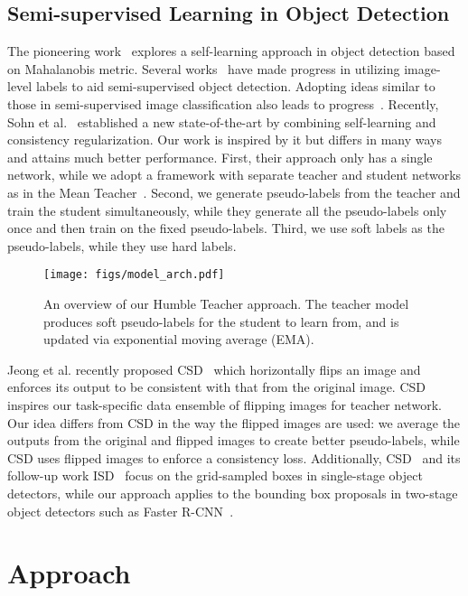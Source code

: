 \documentclass[final]{cvpr}
\begin{document}
\subsection{Semi-supervised Learning in Object Detection}
The pioneering work~\cite{rosenberg2005semi} explores a self-learning approach in object detection based on Mahalanobis metric.
Several works~\cite{gao2019note,hoffman2014lsda,tang2016large} have made progress in utilizing image-level labels to aid semi-supervised object detection.
Adopting ideas similar to those in semi-supervised image classification also leads to progress~\cite{zoph2020rethinking}.
Recently, Sohn et al.~\cite{sohn2020simple} established a new state-of-the-art by combining self-learning and consistency regularization. 
Our work is inspired by it but differs in many ways and attains much better performance. 
First, their approach only has a single network, while we adopt a framework with separate teacher and student networks as in the Mean Teacher~\cite{tarvainen2017mean}.
Second, we generate pseudo-labels from the teacher and train the student simultaneously, while they generate all the pseudo-labels only once and then train on the fixed pseudo-labels.
Third, we use soft labels as the pseudo-labels, while they use hard labels.

\begin{figure*}[htbp]
  \centering
  \texttt{[image: figs/model\_arch.pdf]}
  \caption{An overview of our Humble Teacher approach. The teacher model produces soft pseudo-labels for the student to learn from, and is updated via exponential moving average (EMA).}\label{fig:arch_overview}
\end{figure*}

Jeong et al. recently proposed CSD~\cite{jeong2019consistency} which horizontally flips an image and enforces its output to be consistent with that from the original image.
CSD inspires our task-specific data ensemble of flipping images for teacher network.
Our idea differs from CSD in the way the flipped images are used: we average the outputs from the original and flipped images to create better pseudo-labels, while CSD uses flipped images to enforce a consistency loss.
Additionally, CSD~\cite{jeong2019consistency} and its follow-up work ISD~\cite{jeong2020interpolation} focus on the grid-sampled boxes in single-stage object detectors, 
while our approach applies to the bounding box proposals in two-stage object detectors such as Faster R-CNN~\cite{ren2015faster}.


\section{Approach}
\label{sec:approach}
\end{document}
